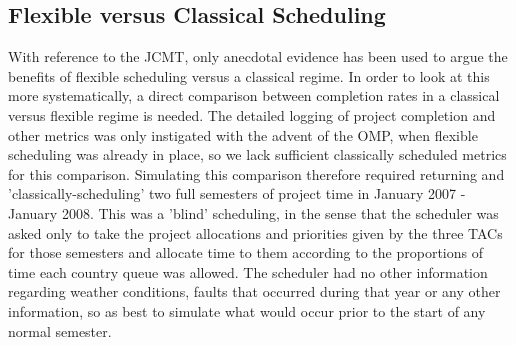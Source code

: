 \documentclass[]{spie}  %
\begin{document}
\subsection{Flexible versus Classical Scheduling}\label{sec:sched}

With reference to the JCMT, only anecdotal evidence has been used to
argue the benefits of flexible scheduling versus a classical regime.
In order to look at this more systematically, a direct comparison
between completion rates in a classical versus flexible regime is
needed. The detailed logging of project completion and other metrics
was only instigated with the advent of the OMP, when flexible
scheduling was already in place, so we lack sufficient classically
scheduled metrics for this comparison. Simulating this comparison
therefore required returning and 'classically-scheduling' two full
semesters of project time in January 2007 - January 2008. This was a
'blind' scheduling, in the sense that the scheduler was asked only to
take the project allocations and priorities given by the three TACs
for those semesters and allocate time to them according to the
proportions of time each country queue was allowed. The scheduler had
no other information regarding weather conditions, faults that
occurred during that year or any other information, so as best to
simulate what would occur prior to the start of any normal semester.
\end{document}
